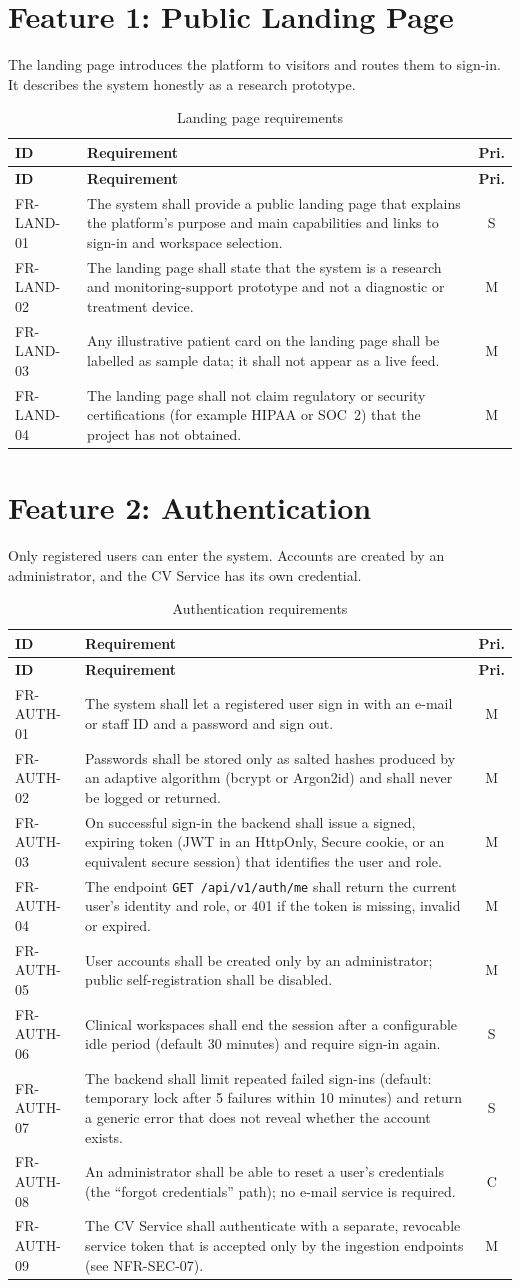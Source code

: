\documentclass[a4paper,11pt]{scrreprt}
\makeatletter
\newenvironment{reqtable}[1]{%
  \small
  \begin{longtable}{@{}>{\ttfamily\footnotesize}p{2.55cm}>{\raggedright\arraybackslash}p{10.7cm}c@{}}
  \caption{#1}\\
  \toprule \textbf{ID} & \textbf{Requirement} & \textbf{Pri.}\\ \midrule
  \endfirsthead
  \toprule \textbf{ID} & \textbf{Requirement} & \textbf{Pri.}\\ \midrule
  \endhead
  \bottomrule
  \endfoot
}{%
  \end{longtable}\normalsize
}
\newcommand{\req}[3]{#1 & #2 & #3 \\ \midrule}
\newcommand{\code}[1]{\texttt{#1}}
\makeatother
\begin{document}
\section{Feature 1: Public Landing Page}
The landing page introduces the platform to visitors and routes them to sign-in. It describes the system honestly as a research prototype.
\begin{reqtable}{Landing page requirements}
\req{FR-LAND-01}{The system shall provide a public landing page that explains the platform's purpose and main capabilities and links to sign-in and workspace selection.}{S}
\req{FR-LAND-02}{The landing page shall state that the system is a research and monitoring-support prototype and not a diagnostic or treatment device.}{M}
\req{FR-LAND-03}{Any illustrative patient card on the landing page shall be labelled as sample data; it shall not appear as a live feed.}{M}
\req{FR-LAND-04}{The landing page shall not claim regulatory or security certifications (for example HIPAA or SOC~2) that the project has not obtained.}{M}
\end{reqtable}

\section{Feature 2: Authentication}
Only registered users can enter the system. Accounts are created by an administrator, and the CV Service has its own credential.
\begin{reqtable}{Authentication requirements}
\req{FR-AUTH-01}{The system shall let a registered user sign in with an e-mail or staff ID and a password and sign out.}{M}
\req{FR-AUTH-02}{Passwords shall be stored only as salted hashes produced by an adaptive algorithm (bcrypt or Argon2id) and shall never be logged or returned.}{M}
\req{FR-AUTH-03}{On successful sign-in the backend shall issue a signed, expiring token (JWT in an HttpOnly, Secure cookie, or an equivalent secure session) that identifies the user and role.}{M}
\req{FR-AUTH-04}{The endpoint \code{GET /api/v1/auth/me} shall return the current user's identity and role, or 401 if the token is missing, invalid or expired.}{M}
\req{FR-AUTH-05}{User accounts shall be created only by an administrator; public self-registration shall be disabled.}{M}
\req{FR-AUTH-06}{Clinical workspaces shall end the session after a configurable idle period (default 30 minutes) and require sign-in again.}{S}
\req{FR-AUTH-07}{The backend shall limit repeated failed sign-ins (default: temporary lock after 5 failures within 10 minutes) and return a generic error that does not reveal whether the account exists.}{S}
\req{FR-AUTH-08}{An administrator shall be able to reset a user's credentials (the ``forgot credentials'' path); no e-mail service is required.}{C}
\req{FR-AUTH-09}{The CV Service shall authenticate with a separate, revocable service token that is accepted only by the ingestion endpoints (see NFR-SEC-07).}{M}
\end{reqtable}
\end{document}
